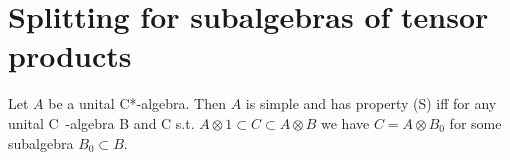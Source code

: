 \section{Splitting for subalgebras of tensor products}
\cite{zacharias2001splitting}
\begin{theorem}
  Let $A$ be a unital C*-algebra.
  Then $A$ is simple and has property (S) iff for any unital C~-algebra B and C s.t. $A \otimes 1 \subset C \subset A \otimes B$
  we have $C = A \otimes B_0$ for some subalgebra $B_0 \subset B$.
\end{theorem}

